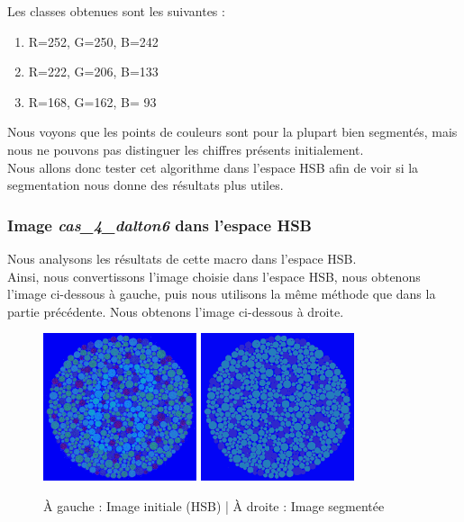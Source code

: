 \documentclass[a4paper]{article}
\begin{document}
Les classes obtenues sont les suivantes :

\begin{enumerate}
  \item R=252, G=250, B=242
  \item R=222, G=206, B=133
  \item R=168, G=162, B= 93
\end{enumerate}

Nous voyons que les points de couleurs sont pour la plupart bien segmentés, mais nous ne pouvons pas distinguer les chiffres présents initialement.\\
Nous allons donc tester cet algorithme dans l'espace HSB afin de voir si la segmentation nous donne des résultats plus utiles.

\clearpage
\subsubsection{Image {\em cas\_4\_dalton6} dans l'espace HSB}

Nous analysons les résultats de cette macro dans l'espace HSB.\\
Ainsi, nous convertissons l'image choisie dans l'espace HSB, nous obtenons l'image ci-dessous à gauche, puis nous utilisons la même méthode que dans la partie précédente. Nous obtenons l'image ci-dessous à droite.

\begin{figure}[H]
\begin{center}
\includegraphics[width=170px]{../resultats/cas_4_dalton6_hsb.png}
\includegraphics[width=170px]{../resultats/cas_4_dalton6_hsb_seg.png}
\end{center}
\caption{À gauche : Image initiale (HSB) | À droite : Image segmentée}
\end{figure}
\end{document}
